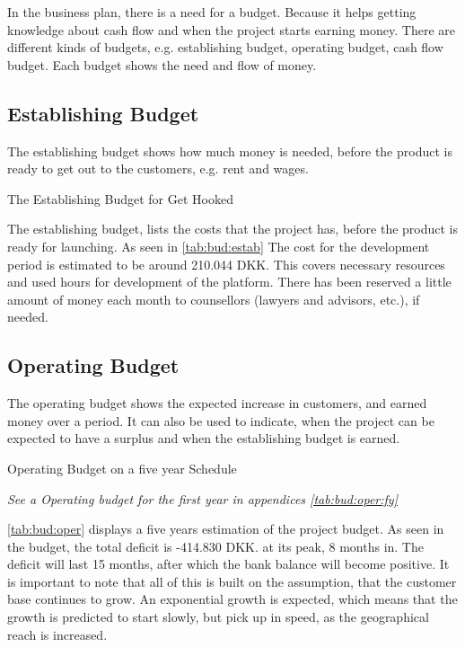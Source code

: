 In the business plan, there is a need for a budget. Because it helps getting knowledge about cash flow and when the project starts earning money. There are different kinds of budgets, e.g. establishing budget, operating budget, cash flow budget. Each budget shows the need and flow of money.


\subsection{Establishing Budget}
The establishing budget shows how much money is needed, before the product is ready to get out to the customers, e.g. rent and wages.


\begin{table}[H]
\centering
\caption{The Establishing Budget for Get Hooked}
\label{tab:bud:estab}

\end{table}

The establishing budget, lists the costs that the project has, before the product is ready for launching. As seen in \autoref{tab:bud:estab} The cost for the development period is estimated to be around 210.044 DKK. This covers necessary resources and used hours for development of the platform. There has been reserved a little amount of money each month to counsellors (lawyers and advisors, etc.), if needed.

\subsection{Operating Budget}

The operating budget shows the expected increase in customers, and earned money over a period. It can also be used to indicate, when the project can be expected to have a surplus and when the establishing budget is earned.

\begin{table*}[t!]
\centering
\caption{Operating Budget on a five year Schedule}
\label{tab:bud:oper}

\textit{See a Operating budget for the first year in appendices \ref{tab:bud:oper:fy}}
\end{table*}


\autoref{tab:bud:oper} displays a five years estimation of the project budget. As seen in the budget, the total deficit is -414.830 DKK. at its peak, 8 months in. The deficit will last 15 months, after which the bank balance will become positive. It is important to note that all of this is built on the assumption, that the customer base continues to grow. An exponential  growth is expected, which means that the growth is predicted to start slowly, but pick up in speed, as the geographical reach is increased.

